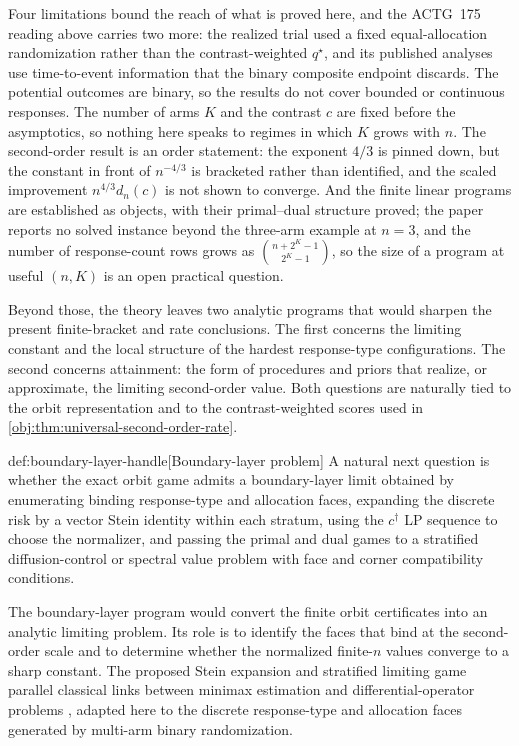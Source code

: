 \documentclass[11pt]{article}
\begin{document}
Four limitations bound the reach of what is proved here, and the ACTG~175 reading above carries two more: the realized trial used a fixed equal-allocation randomization rather than the contrast-weighted \(q^\star\), and its published analyses use time-to-event information that the binary composite endpoint discards. The potential outcomes are binary, so the results do not cover bounded or continuous responses. The number of arms \(K\) and the contrast \(c\) are fixed before the asymptotics, so nothing here speaks to regimes in which \(K\) grows with \(n\). The second-order result is an order statement: the exponent \(4/3\) is pinned down, but the constant in front of \(n^{-4/3}\) is bracketed rather than identified, and the scaled improvement \(n^{4/3}d_n(c)\) is not shown to converge. And the finite linear programs are established as objects, with their primal--dual structure proved; the paper reports no solved instance beyond the three-arm example at \(n=3\), and the number of response-count rows grows as \(\binom{n+2^K-1}{2^K-1}\), so the size of a program at useful \((n,K)\) is an open practical question.

Beyond those, the theory leaves two analytic programs that would sharpen the present finite-bracket and rate conclusions. The first concerns the limiting constant and the local structure of the hardest response-type configurations. The second concerns attainment: the form of procedures and priors that realize, or approximate, the limiting second-order value. Both questions are naturally tied to the orbit representation and to the contrast-weighted scores used in \cref{obj:thm:universal-second-order-rate}.

\begin{remarkv}{def:boundary-layer-handle}[Boundary-layer problem]
A natural next question is whether the exact orbit game admits a boundary-layer limit obtained by enumerating binding response-type and allocation faces, expanding the discrete risk by a vector Stein identity within each stratum, using the \(c^\dagger\) LP sequence to choose the normalizer, and passing the primal and dual games to a stratified diffusion-control or spectral value problem with face and corner compatibility conditions.
\end{remarkv}

The boundary-layer program would convert the finite orbit certificates into an analytic limiting problem. Its role is to identify the faces that bind at the second-order scale and to determine whether the normalized finite-\(n\) values converge to a sharp constant. The proposed Stein expansion and stratified limiting game parallel classical links between minimax estimation and differential-operator problems \citep{levit_1986_schrodinger,johnstone_1992}, adapted here to the discrete response-type and allocation faces generated by multi-arm binary randomization.
\end{document}
